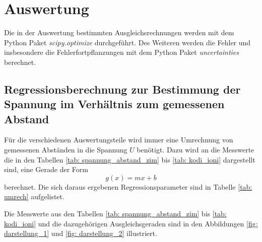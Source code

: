 \section{Auswertung}
Die in der Auswertung bestimmten Ausgleichsrechnungen werden mit
dem Python Paket \emph{scipy.optimize}\cite{scipy} durchgeführt.
Des Weiteren werden die Fehler und insbesondere die Fehlerfortpflanzungen
mit dem Python Paket \emph{uncertainties}\cite{uncertainties} berechnet.

\subsection{Regressionsberechnung zur Bestimmung der Spannung im Verhältnis zum gemessenen Abstand}\label{sec: ausgleich}

Für die verschiedenen Auswertungsteile wird immer eine Umrechnung von gemessenen Abständen
in die Spannung $U$ benötigt. Dazu wird an die Messwerte die in den Tabellen \ref{tab: spannung_abstand_zim} bis \ref{tab: kodi_ioni} dargestellt sind,
eine Gerade der Form
\begin{equation}
  \label{eq: gerade}
  g(x)=mx+b
\end{equation}
berechnet.
Die sich daraus ergebenen Regressionsparameter sind in Tabelle \ref{tab: umrech} aufgelistet.
\FloatBarrier





Die Messwerte aus den Tabellen \ref{tab: spannung_abstand_zim} bis \ref{tab: kodi_ioni}
und die dazugehörigen Ausgleichsgeraden sind in
den Abbildungen \ref{fig: darstellung_1} und \ref{fig: darstellung_2} illustriert.
